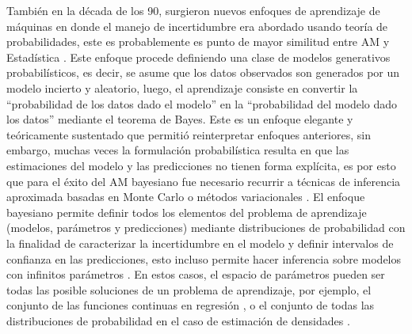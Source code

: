 También en la década de los 90, surgieron nuevos enfoques de aprendizaje de máquinas en donde el manejo de incertidumbre era abordado usando teoría de probabilidades, este es probablemente es punto de mayor similitud entre AM y Estadística \cite{ghahramani_2015}. Este enfoque procede definiendo una clase de modelos generativos probabilísticos, es decir, se asume que los datos observados son generados por un modelo incierto y aleatorio, luego, el aprendizaje consiste en convertir la “probabilidad de los datos dado el modelo” en la “probabilidad del modelo dado los datos” mediante el teorema de Bayes. Este es un enfoque elegante y teóricamente sustentado que permitió reinterpretar enfoques anteriores, sin embargo, muchas veces la formulación probabilística resulta en que las estimaciones del modelo y las predicciones no tienen forma explícita, es por esto que para el éxito del AM bayesiano fue necesario recurrir a técnicas de inferencia aproximada basadas en Monte Carlo \cite{neal_1993} o métodos variacionales \cite{jordan_1999}. El enfoque bayesiano permite definir todos los elementos del problema de aprendizaje (modelos, parámetros y predicciones) mediante distribuciones de probabilidad con la finalidad de caracterizar la incertidumbre en el modelo y definir intervalos de confianza en las predicciones, esto incluso permite hacer inferencia sobre modelos con infinitos parámetros \cite{hjort_2010}. En estos casos, el espacio de parámetros pueden ser todas las posible soluciones de un problema de aprendizaje, por ejemplo, el conjunto de las funciones continuas en regresión \cite{rasmussen_2006}, o el conjunto de todas las distribuciones de probabilidad en el caso de estimación de densidades \cite{ferguson_1973}.

